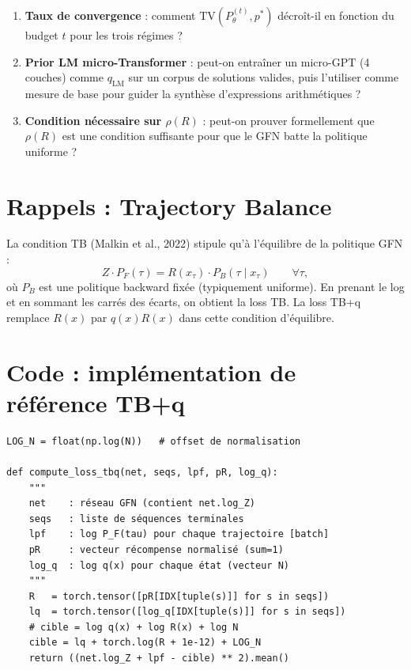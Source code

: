 \documentclass[11pt,a4paper]{article}
\theoremstyle{plain}
\theoremstyle{definition}
\theoremstyle{remark}
\newcommand{\pF}{P_F}
\newcommand{\pB}{P_B}
\newcommand{\pth}{P_\theta}
\newcommand{\TV}{\mathrm{TV}}
\begin{document}
\begin{enumerate}
  \item \textbf{Taux de convergence} : comment $\TV(\pth^{(t)}, p^*)$ décroît-il
  en fonction du budget $t$ pour les trois régimes ?

  \item \textbf{Prior LM micro-Transformer} : peut-on entraîner un micro-GPT (4 couches)
  comme $q_{\mathrm{LM}}$ sur un corpus de solutions valides, puis l'utiliser comme
  mesure de base pour guider la synthèse d'expressions arithmétiques ?

  \item \textbf{Condition nécessaire sur $\rho(R)$} : peut-on prouver formellement
  que $\rho(R)$ est une condition suffisante pour que le GFN batte la politique uniforme ?
\end{enumerate}

\appendix
\section{Rappels : Trajectory Balance}
\label{app:tb}

La condition TB (Malkin et al., 2022) stipule qu'à l'équilibre de la politique GFN :
\begin{equation}
  Z \cdot \pF(\tau) = R(x_\tau) \cdot \pB(\tau \mid x_\tau) \qquad \forall \tau,
\end{equation}
où $\pB$ est une politique backward fixée (typiquement uniforme).
En prenant le log et en sommant les carrés des écarts, on obtient la loss TB.
La loss TB+q remplace $R(x)$ par $q(x)R(x)$ dans cette condition d'équilibre.

\section{Code : implémentation de référence TB+q}
\label{app:code}

\begin{verbatim}
LOG_N = float(np.log(N))   # offset de normalisation

def compute_loss_tbq(net, seqs, lpf, pR, log_q):
    """
    net    : réseau GFN (contient net.log_Z)
    seqs   : liste de séquences terminales
    lpf    : log P_F(tau) pour chaque trajectoire [batch]
    pR     : vecteur récompense normalisé (sum=1)
    log_q  : log q(x) pour chaque état (vecteur N)
    """
    R   = torch.tensor([pR[IDX[tuple(s)]] for s in seqs])
    lq  = torch.tensor([log_q[IDX[tuple(s)]] for s in seqs])
    # cible = log q(x) + log R(x) + log N
    cible = lq + torch.log(R + 1e-12) + LOG_N
    return ((net.log_Z + lpf - cible) ** 2).mean()
\end{verbatim}
\end{document}
